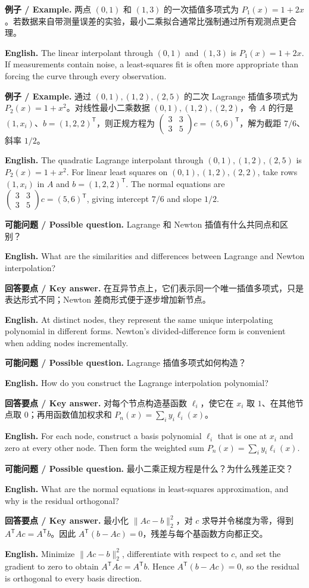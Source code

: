 \documentclass[UTF8,11pt,a4paper]{ctexart}
\newcommand{\EN}[1]{\par\noindent\textbf{English.} #1\par}
\newcommand{\EX}[2]{\par\noindent\textbf{例子 / Example.} #1\par\EN{#2}}
\newcommand{\ASK}[4]{\par\noindent\textbf{可能问题 / Possible question.} #1\par\EN{#2}\noindent\textbf{回答要点 / Key answer.} #3\par\EN{#4}\medskip}
\begin{document}
\EX{两点 $(0,1)$ 和 $(1,3)$ 的一次插值多项式为 $P_1(x)=1+2x$。若数据来自带测量误差的实验，最小二乘拟合通常比强制通过所有观测点更合理。}{The linear interpolant through $(0,1)$ and $(1,3)$ is $P_1(x)=1+2x$. If measurements contain noise, a least-squares fit is often more appropriate than forcing the curve through every observation.}

\EX{通过 $(0,1),(1,2),(2,5)$ 的二次 Lagrange 插值多项式为 $P_2(x)=1+x^2$。对线性最小二乘数据 $(0,1),(1,2),(2,2)$，令 $A$ 的行是 $(1,x_i)$、$b=(1,2,2)^{\mathsf T}$，则正规方程为 $\begin{pmatrix}3&3\\3&5\end{pmatrix}c=(5,6)^{\mathsf T}$，解为截距 $7/6$、斜率 $1/2$。}{The quadratic Lagrange interpolant through $(0,1),(1,2),(2,5)$ is $P_2(x)=1+x^2$. For linear least squares on $(0,1),(1,2),(2,2)$, take rows $(1,x_i)$ in $A$ and $b=(1,2,2)^{\mathsf T}$. The normal equations are $\begin{pmatrix}3&3\\3&5\end{pmatrix}c=(5,6)^{\mathsf T}$, giving intercept $7/6$ and slope $1/2$.}

\ASK{Lagrange 和 Newton 插值有什么共同点和区别？}{What are the similarities and differences between Lagrange and Newton interpolation?}{在互异节点上，它们表示同一个唯一插值多项式，只是表达形式不同；Newton 差商形式便于逐步增加新节点。}{At distinct nodes, they represent the same unique interpolating polynomial in different forms. Newton's divided-difference form is convenient when adding nodes incrementally.}

\ASK{Lagrange 插值多项式如何构造？}{How do you construct the Lagrange interpolation polynomial?}{对每个节点构造基函数 $\ell_i$，使它在 $x_i$ 取 $1$、在其他节点取 $0$；再用函数值加权求和 $P_n(x)=\sum_i y_i\ell_i(x)$。}{For each node, construct a basis polynomial $\ell_i$ that is one at $x_i$ and zero at every other node. Then form the weighted sum $P_n(x)=\sum_i y_i\ell_i(x)$.}

\ASK{最小二乘正规方程是什么？为什么残差正交？}{What are the normal equations in least-squares approximation, and why is the residual orthogonal?}{最小化 $\|Ac-b\|_2^2$，对 $c$ 求导并令梯度为零，得到 $A^{\mathsf T}Ac=A^{\mathsf T}b$。因此 $A^{\mathsf T}(b-Ac)=0$，残差与每个基函数方向都正交。}{Minimize $\|Ac-b\|_2^2$, differentiate with respect to $c$, and set the gradient to zero to obtain $A^{\mathsf T}Ac=A^{\mathsf T}b$. Hence $A^{\mathsf T}(b-Ac)=0$, so the residual is orthogonal to every basis direction.}
\end{document}
